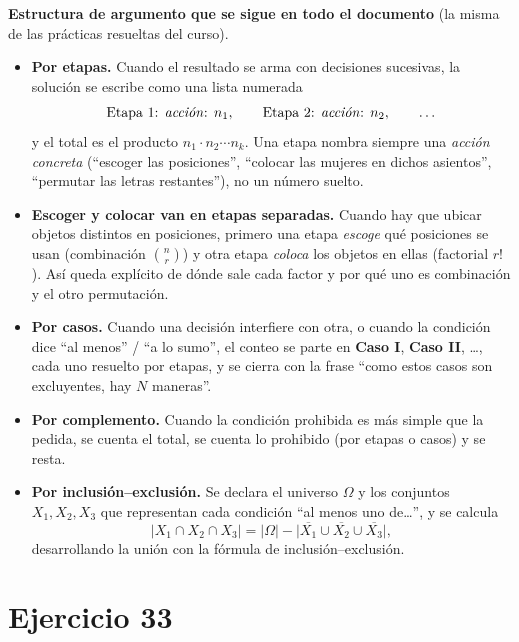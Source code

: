 \documentclass[11pt]{article}
\begin{document}
\begin{tip}
\textbf{Estructura de argumento que se sigue en todo el documento} (la misma de las prácticas resueltas del curso).

\begin{itemize}[leftmargin=*]
  \item \textbf{Por etapas.} Cuando el resultado se arma con decisiones sucesivas, la solución se escribe como una lista numerada
  \[
    \text{Etapa 1: \emph{acción}: } n_1,\qquad \text{Etapa 2: \emph{acción}: } n_2,\qquad\dots
  \]
  y el total es el producto $n_1\cdot n_2\cdots n_k$. Una etapa nombra siempre una \emph{acción concreta} (``escoger las posiciones'', ``colocar las mujeres en dichos asientos'', ``permutar las letras restantes''), no un número suelto.
  \item \textbf{Escoger y colocar van en etapas separadas.} Cuando hay que ubicar objetos distintos en posiciones, primero una etapa \emph{escoge} qué posiciones se usan (combinación $\binom{n}{r}$) y otra etapa \emph{coloca} los objetos en ellas (factorial $r!$). Así queda explícito de dónde sale cada factor y por qué uno es combinación y el otro permutación.
  \item \textbf{Por casos.} Cuando una decisión interfiere con otra, o cuando la condición dice ``al menos'' / ``a lo sumo'', el conteo se parte en \textbf{Caso I}, \textbf{Caso II}, \dots, cada uno resuelto por etapas, y se cierra con la frase ``como estos casos son excluyentes, hay $N$ maneras''.
  \item \textbf{Por complemento.} Cuando la condición prohibida es más simple que la pedida, se cuenta el total, se cuenta lo prohibido (por etapas o casos) y se resta.
  \item \textbf{Por inclusión--exclusión.} Se declara el universo $\Omega$ y los conjuntos $X_1,X_2,X_3$ que representan cada condición ``al menos uno de\dots'', y se calcula
  \[
    |X_1\cap X_2\cap X_3| = |\Omega| - \big|\overline{X_1}\cup \overline{X_2}\cup \overline{X_3}\big| ,
  \]
  desarrollando la unión con la fórmula de inclusión--exclusión.
\end{itemize}
\end{tip}

\section*{Ejercicio 33}
\end{document}
